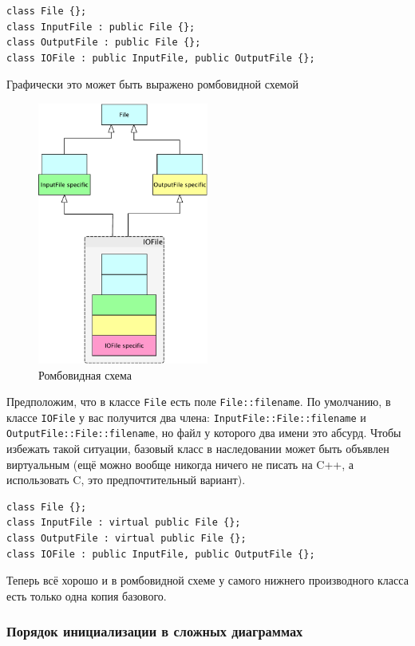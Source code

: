 \documentclass[a4paper,12pt,oneside]{article}
\begin{document}
\begin{lstlisting}
class File {};
class InputFile : public File {};
class OutputFile : public File {};
class IOFile : public InputFile, public OutputFile {};
\end{lstlisting}

Графически это может быть выражено ромбовидной схемой

\begin{figure}[h!]
\centering
\includegraphics[width=0.5\textwidth]{illustrations/romb-crop.pdf}
\caption{Ромбовидная схема}
\label{fig:romb-crop}
\end{figure}

Предположим, что в классе \lstinline!File! есть поле \lstinline!File::filename!. По умолчанию, в классе \lstinline!IOFile! у вас получится два члена: \lstinline!InputFile::File::filename! и \lstinline!OutputFile::File::filename!, но файл у которого два имени это абсурд. Чтобы избежать такой ситуации, базовый класс в наследовании может быть объявлен виртуальным (ещё можно вообще никогда ничего не писать на C++, а использовать C, это предпочтительный вариант).

\begin{lstlisting}
class File {};
class InputFile : virtual public File {};
class OutputFile : virtual public File {};
class IOFile : public InputFile, public OutputFile {};
\end{lstlisting}

Теперь всё хорошо и в ромбовидной схеме у самого нижнего производного класса есть только одна копия базового.

\subsubsection{Порядок инициализации в сложных диаграммах}
\end{document}
